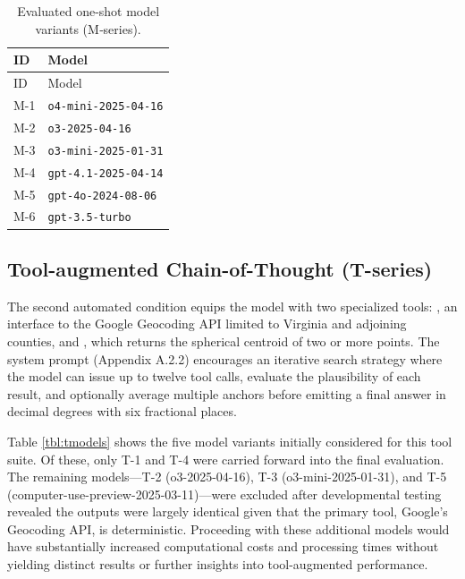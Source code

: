 \begin{longtable}[]{@{}ll@{}}
\caption{\label{tbl:mmodels}Evaluated one-shot model variants
(M‑series).}\tabularnewline
\toprule\noalign{}
ID & Model \\
\midrule\noalign{}
\endfirsthead
\toprule\noalign{}
ID & Model \\
\midrule\noalign{}
\endhead
\bottomrule\noalign{}
\endlastfoot
M-1 & \passthrough{\lstinline!o4-mini-2025-04-16!} \\
M-2 & \passthrough{\lstinline!o3-2025-04-16!} \\
M-3 & \passthrough{\lstinline!o3-mini-2025-01-31!} \\
M-4 & \passthrough{\lstinline!gpt-4.1-2025-04-14!} \\
M-5 & \passthrough{\lstinline!gpt-4o-2024-08-06!} \\
M-6 & \passthrough{\lstinline!gpt-3.5-turbo!} \\
\end{longtable}

\subsection{Tool-augmented Chain-of-Thought
(T-series)}\label{tool-augmented-chain-of-thought-t-series}

The second automated condition equips the model with two specialized
tools: \DIFdelbegin %
\DIFdelend \DIFaddbegin \texttt{}\DIFaddend , an interface to the Google Geocoding API
limited to Virginia and adjoining counties, and
\DIFdelbegin %
\DIFdelend \DIFaddbegin \texttt{}\DIFaddend , which returns the spherical centroid of two
or more points. The system prompt (Appendix A.2.2) encourages an
iterative search strategy where the model can issue up to twelve tool
calls, evaluate the plausibility of each result, and optionally average
multiple anchors before emitting a final answer in decimal degrees with
six fractional places.

Table \ref{tbl:tmodels} shows the five model variants initially
considered for this tool suite. Of these, only T-1 and T-4 were carried
forward into the final evaluation. The remaining models---T-2
(o3-2025-04-16), T-3 (o3-mini-2025-01-31), and T-5
(computer-use-preview-2025-03-11)---were excluded after developmental
testing revealed the outputs were largely identical given that the
primary tool, Google's Geocoding API, is deterministic. Proceeding with
these additional models would have substantially increased computational
costs and processing times without yielding distinct results or further
insights into tool-augmented performance. \DIFaddbegin {}\DIFaddend 

